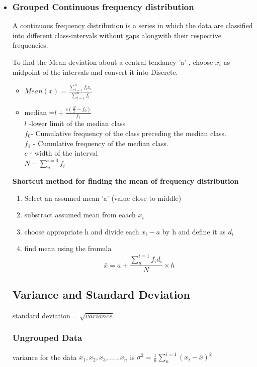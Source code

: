 \documentclass[12pt]{article}
\newcommand{\summation}[2]{\sum\limits^{#1}_{#2}}
\begin{document}
\begin{multicols}{2}
\begin{itemize}
    \item \subsubsection*{Grouped Continuous frequency distribution }A continuous frequency distribution is a series
    in which the data are classified into different class-intervals without gaps alongwith
    their respective frequencies.
    
    To find the Mean deviation about a central tendancy 'a' , choose $x_i$ as midpoint of the intervals and convert it into Discrete.

    \begin{itemize}
        \item $Mean(\bar{x}) =\frac{\summation{n}{i=1}f_i x_i}{\summation{n}{i=1}f_i}$
        \item median =$l+\frac{c(\frac{N}{2}-f_0)}{f_1}$\\
        $l$ -lower limit of the median class \\
        $f_0 $- Cumulative frequency of the class preceding the median class.\\
        $f_1$ - Cumulative frequency of the median class.\\
        $c$ - width of the interval \\
        $N-\summation{i=0}{n}f_i$



    \end{itemize}

    \textbf{Shortcut method for finding the mean of frequency distribution }

    \begin{enumerate}
        \item Select an assumed mean 'a' (value close to middle)
        \item substract assumed mean from eaach $x_i$
        \item choose appropriate h and divide each $x_i -a$ by h and define it as $d_i$
        \item find mean using the fromula 
        $$\bar{x}= a+\frac{\summation{i=1}{n}f_i d_i}{N} \times h$$
    \end{enumerate}

    \subsection*{Variance and Standard Deviation}
standard deviation$ = \sqrt{variance}$
    \subsubsection*{Ungrouped Data}
    variance  for the data  $x_1, x_2, x_3, ...., x_n$ is  
    $\sigma^2 = \frac{1}{n} \summation{i=1}{n} (x_i-\bar{x})^2$


\end{itemize}
\end{multicols}
\end{document}
